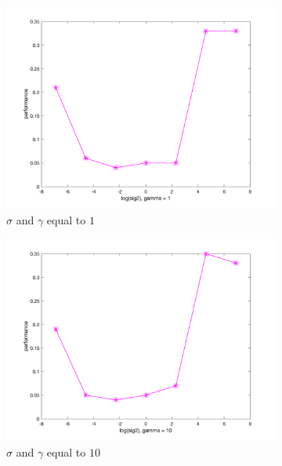 \documentclass[a4paper, 11pt, one column]{article}
\begin{document}
\begin{figure}[]
\begin{subfigure}{0.33\linewidth}
            \includegraphics[width=\linewidth]{images/10f_sig2_g_1.png}
            \caption{$\sigma$ and $\gamma$ equal to $1$}
        \end{subfigure}
        \begin{subfigure}{0.33\linewidth}
            \includegraphics[width=\linewidth]{images/10f_sig2_g_10.png}
            \caption{$\sigma$ and $\gamma$ equal to $10$}
        \end{subfigure}
		\begin{subfigure}{0.33\linewidth}

\end{subfigure}
\end{figure}
\end{document}
